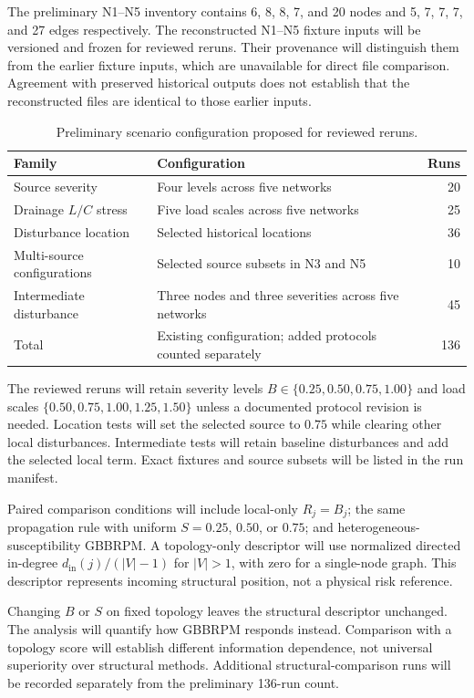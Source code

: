 The preliminary N1--N5 inventory contains 6, 8, 8, 7, and 20 nodes and
5, 7, 7, 7, and 27 edges respectively. The reconstructed N1--N5 fixture
inputs will be versioned and frozen for reviewed reruns. Their provenance
will distinguish them from the earlier fixture inputs, which are unavailable
for direct file comparison. Agreement with preserved historical outputs
does not establish that the reconstructed files are identical to those
earlier inputs.

\begin{table}[H]
\centering
\caption{Preliminary scenario configuration proposed for reviewed reruns.}
\label{tab:planned-scenarios}
\small
\begin{tabularx}{\textwidth}{@{}L L r@{}}
\toprule
Family & Configuration & Runs\\
\midrule
Source severity & Four levels across five networks & 20\\
Drainage $L/C$ stress & Five load scales across five networks & 25\\
Disturbance location & Selected historical locations & 36\\
Multi-source configurations & Selected source subsets in N3 and N5 & 10\\
Intermediate disturbance & Three nodes and three severities across five networks & 45\\
\midrule
Total & Existing configuration; added protocols counted separately & 136\\
\bottomrule
\end{tabularx}
\end{table}

The reviewed reruns will retain severity levels
$B\in\{0.25,0.50,0.75,1.00\}$ and load scales
$\{0.50,0.75,1.00,1.25,1.50\}$ unless a documented protocol revision is
needed. Location tests will set the selected source to $0.75$ while
clearing other local disturbances. Intermediate tests will retain
baseline disturbances and add the selected local term.
Exact fixtures and source subsets will be listed in the run manifest.

Paired comparison conditions will include local-only $R_j=B_j$;
the same propagation rule with uniform $S=0.25$, $0.50$, or $0.75$;
and heterogeneous-susceptibility GBBRPM. A topology-only descriptor will
use normalized directed in-degree $d_{\mathrm{in}}(j)/(|V|-1)$ for
$|V|>1$, with zero for a single-node graph. This descriptor represents
incoming structural position, not a physical risk reference.

Changing $B$ or $S$ on fixed topology leaves the structural descriptor
unchanged. The analysis will quantify how GBBRPM responds instead.
Comparison with a topology score will establish different information
dependence, not universal superiority over structural methods.
Additional structural-comparison runs will be recorded separately from
the preliminary 136-run count.

